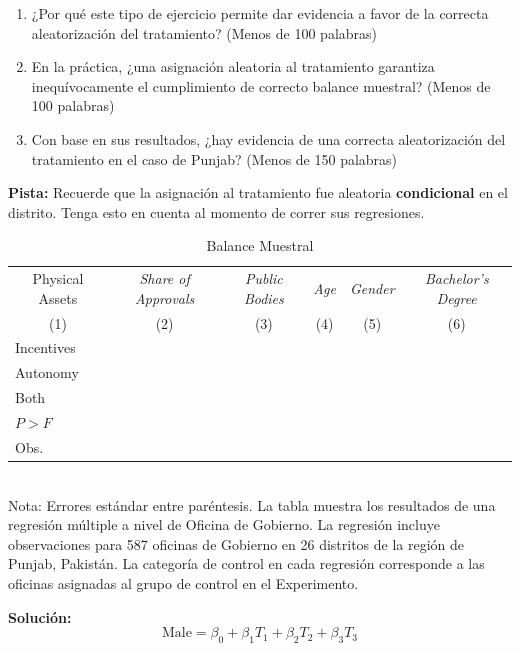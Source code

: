 \documentclass[a4paper, answers, addpoints, 11pt]{exam}
\begin{document}
\begin{enumerate}
    \begin{enumerate}
        \item ¿Por qué este tipo de ejercicio permite dar evidencia a favor de la correcta aleatorización del tratamiento? (Menos de 100 palabras)
        \item En la práctica, ¿una asignación aleatoria al tratamiento garantiza inequívocamente el cumplimiento de correcto balance muestral? (Menos de 100 palabras)
        \item Con base en sus resultados, ¿hay evidencia de una correcta aleatorización del tratamiento en el caso de Punjab? (Menos de 150 palabras)
         \end{enumerate}
        \bigbreak
        \textbf{Pista:} Recuerde que la asignación al tratamiento fue aleatoria \textbf{condicional} en el distrito. Tenga esto en cuenta al momento de correr sus regresiones. 
        \begin{table}[H]
		\centering
			\caption{Balance Muestral}
			\label{tab2:balancetemplacte}
			\begin{tabular}{lccccc}
				\toprule
				\multicolumn{1}{c}{Physical Assets} & \multicolumn{1}{c}{\textit{Share of Approvals}} & \textit{Public Bodies} & \textit{Age} & \textit{Gender} & \textit{Bachelor's Degree}  \\
				\multicolumn{1}{c}{(1)} & 	\multicolumn{1}{c}{(2)} & (3) & (4) & (5) & (6) \\ \toprule
				  \addlinespace 
				Incentives &&&& \\
                Autonomy &&&& \\
                Both &&&& \\ \midrule
                $P>F$ &&&& \\
                Obs.&&&& \\ \bottomrule
            \end{tabular}
             {\footnotesize{\\Nota: Errores estándar entre paréntesis. La tabla muestra los resultados de una regresión múltiple a nivel de Oficina de Gobierno. La regresión incluye observaciones para 587 oficinas de Gobierno en 26 distritos de la región de Punjab, Pakistán.  La categoría de control en cada regresión corresponde a las oficinas asignadas al grupo de control en el Experimento.}}
	\end{table}
     \begin{mdframed}
        \textbf{Solución:}
        \[
\text{Male} = \beta_0 + \beta_1 T_1 + \beta_2 T_2 + \beta_3 T_3
\]


\end{mdframed}
\end{enumerate}
\end{document}
